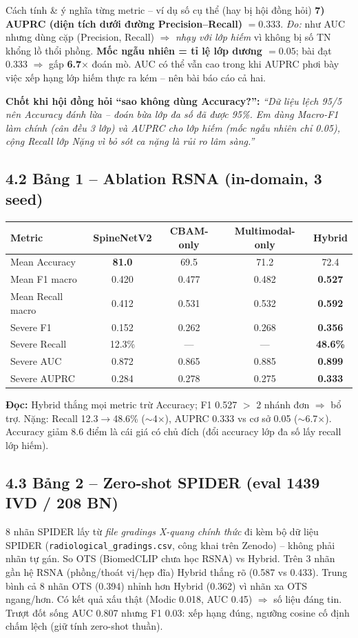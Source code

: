 \documentclass[12pt,a4paper]{article}
\begin{document}
\begin{ctbox}{Cách tính \& ý nghĩa từng metric -- ví dụ số cụ thể (hay bị hội đồng hỏi)}
\textbf{7) AUPRC (diện tích dưới đường Precision--Recall)} $=0.333$. \emph{Đo:} như AUC nhưng dùng cặp (Precision, Recall) $\Rightarrow$ \emph{nhạy với lớp hiếm} vì không bị số TN khổng lồ thổi phồng. \textbf{Mốc ngẫu nhiên = tỉ lệ lớp dương $=0.05$}; bài đạt 0.333 $\Rightarrow$ gấp \textbf{6.7$\times$} đoán mò. AUC có thể vẫn cao trong khi AUPRC phơi bày việc xếp hạng lớp hiếm thực ra kém -- nên bài báo cáo cả hai.

\textbf{Chốt khi hội đồng hỏi ``sao không dùng Accuracy?'':} \emph{``Dữ liệu lệch 95/5 nên Accuracy đánh lừa -- đoán bừa lớp đa số đã được 95\%. Em dùng Macro-F1 làm chính (cân đều 3 lớp) và AUPRC cho lớp hiếm (mốc ngẫu nhiên chỉ 0.05), cộng Recall lớp Nặng vì bỏ sót ca nặng là rủi ro lâm sàng.''}
\end{ctbox}

\subsection{4.2 Bảng 1 -- Ablation RSNA (in-domain, 3 seed)}
\begin{center}\small
\begin{tabular}{lcccc}
\toprule
Metric & SpineNetV2 & CBAM-only & Multimodal-only & Hybrid \\
\midrule
Mean Accuracy & \textbf{81.0} & 69.5 & 71.2 & 72.4 \\
Mean F1 macro & 0.420 & 0.477 & 0.482 & \textbf{0.527} \\
Mean Recall macro & 0.412 & 0.531 & 0.532 & \textbf{0.592} \\
Severe F1 & 0.152 & 0.262 & 0.268 & \textbf{0.356} \\
Severe Recall & 12.3\% & --- & --- & \textbf{48.6\%} \\
Severe AUC & 0.872 & 0.865 & 0.885 & \textbf{0.899} \\
Severe AUPRC & 0.284 & 0.278 & 0.275 & \textbf{0.333} \\
\bottomrule
\end{tabular}
\end{center}
\textbf{Đọc:} Hybrid thắng mọi metric trừ Accuracy; F1 0.527 $>$ 2 nhánh đơn $\Rightarrow$ bổ trợ. Nặng: Recall 12.3$\to$48.6\% ($\sim$4$\times$), AUPRC 0.333 vs cơ sở 0.05 ($\sim$6.7$\times$). Accuracy giảm 8.6 điểm là cái giá có chủ đích (đổi accuracy lớp đa số lấy recall lớp hiếm).

\subsection{4.3 Bảng 2 -- Zero-shot SPIDER (eval 1439 IVD / 208 BN)}
8 nhãn SPIDER lấy từ \emph{file gradings X-quang chính thức} đi kèm bộ dữ liệu SPIDER (\texttt{radiological\_gradings.csv}, công khai trên Zenodo) -- không phải nhãn tự gán. So OTS (BiomedCLIP chưa học RSNA) vs Hybrid. Trên 3 nhãn gần hệ RSNA (phồng/thoát vị/hẹp đĩa) Hybrid thắng rõ (0.587 vs 0.433). Trung bình cả 8 nhãn OTS (0.394) nhỉnh hơn Hybrid (0.362) vì nhãn xa OTS ngang/hơn. Có kết quả xấu thật (Modic 0.018, AUC 0.45) $\Rightarrow$ số liệu đáng tin. Trượt đốt sống AUC 0.807 nhưng F1 0.03: xếp hạng đúng, ngưỡng cosine cố định chấm lệch (giữ tính zero-shot thuần).
\end{document}
